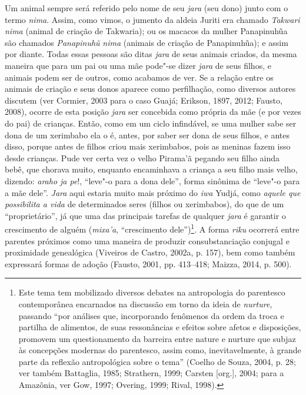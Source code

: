Um animal sempre será referido pelo nome de seu \emph{jara} (seu dono)
junto com o termo \emph{nima}. Assim, como vimos, o jumento da aldeia
Juriti era chamado \emph{Takwari} \emph{nima} (animal de criação de
Takwaria); ou os macacos da mulher Panapinuhũa são chamados
\emph{Panapinuhũ} \emph{nima} (animais de criação de Panapinuhũa); e
assim por diante. Todas essas pessoas são ditas \emph{jara} de seus
animais criados, da mesma maneira que para um pai ou uma mãe pode"-se
dizer \emph{jara} de seus filhos, e animais podem ser de outros, como
acabamos de ver. Se a relação entre os animais de criação e seus donos
aparece como perfilhação, como diversos autores discutem (ver Cormier,
2003 para o caso Guajá; Erikson, 1897, 2012; Fausto, 2008), ocorre de esta
posição \emph{jara} ser concebida como própria da mãe (e por vezes do
pai) de crianças. Então, como em um ciclo infindável, se uma mulher sabe
ser dona de um xerimbabo ela o é, antes, por saber ser dona de seus
filhos, e antes disso, porque antes de filhos criou mais xerimbabos,
pois as meninas fazem isso desde crianças. Pude ver certa vez o velho
Pirama'ã pegando seu filho ainda bebê, que chorava muito, enquanto
encaminhava a criança a seu filho mais velho, dizendo: \emph{araho ja
pe}!, ``leve"-o para a dona dele'', forma sinônima de ``leve"-o para a mãe
dele''. \emph{Jara} aqui estaria muito mais próximo do \emph{iwa} Yudjá,
como \emph{aquele que possibilita a vida} de determinados seres (filhos
ou xerimbabos), do que de um ``proprietário'', já que uma das principais
tarefas de qualquer \emph{jara} é garantir o crescimento de alguém
(\emph{mixa'a}, ``crescimento dele'')\footnote{Este tema tem mobilizado
  diversos debates na antropologia do parentesco contemporânea
  encarnados na discussão em torno da ideia de \emph{nurture}, passando
  ``por análises que, incorporando fenômenos da ordem da troca e partilha
      de alimentos, de suas ressonâncias e efeitos sobre afetos e
      disposições, promovem um questionamento da barreira entre nature e
      nurture que subjaz às concepções modernas do parentesco, assim como,
      inevitavelmente, à grande parte da reflexão antropológica sobre o
      tema'' (Coelho de Souza, 2004, p. 28; ver também Battaglia, 1985; Strathern,
  1999; Carsten {[}org.{]}, 2004; para a Amazônia, ver Gow, 1997; Overing, 1999; Rival, 1998).}. A forma \emph{riku} ocorrerá entre parentes
próximos como uma maneira de produzir consubstanciação conjugal e
proximidade genealógica (Viveiros de Castro, 2002a, p. 157), bem como
também expressará formas de adoção (Fausto, 2001, pp. 413--418; Maizza, 2014,
p. 500).

